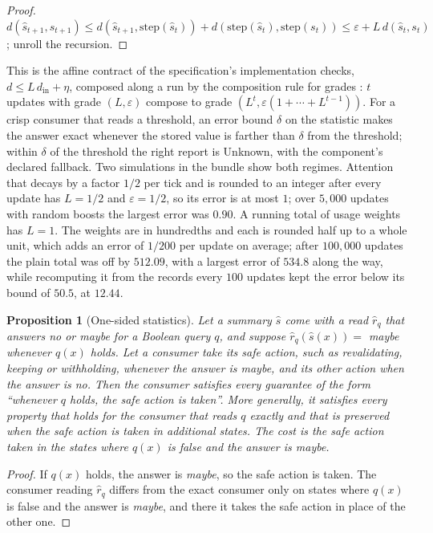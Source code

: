 \documentclass[11pt]{article}
\newcommand{\step}{\mathrm{step}}
\theoremstyle{definition}
\theoremstyle{plain}
\newtheorem{proposition}[definition]{Proposition}
\begin{document}
\begin{proof}
$d(\hat s_{t+1},s_{t+1})\le d(\hat s_{t+1},\step(\hat s_t))+d(\step(\hat s_t),\step(s_t))\le
\varepsilon+L\,d(\hat s_t,s_t)$; unroll the recursion.
\end{proof}

This is the affine contract of the specification's implementation checks, $d\le L\,d_{\mathrm{in}}+
\eta$, composed along a run by the composition rule for grades \cite[Proposition~9.1]{spec}: $t$
updates with grade $(L,\varepsilon)$ compose to grade $(L^t,\varepsilon(1+\cdots+L^{t-1}))$. For a
crisp consumer that reads a threshold, an error bound $\delta$ on the statistic makes the answer
exact whenever the stored value is farther than $\delta$ from the threshold; within $\delta$ of the
threshold the right report is Unknown, with the component's declared fallback.
Two simulations in the bundle show both regimes. Attention that decays by a factor $1/2$ per tick
and is rounded to an integer after every update has $L=1/2$ and $\varepsilon=1/2$, so its error is
at most $1$; over $5{,}000$ updates with random boosts the largest error was $0.90$. A running total
of usage weights has $L=1$. The weights are in hundredths and each is rounded half up to a whole
unit, which adds an error of $1/200$ per update on average; after $100{,}000$ updates the plain
total was off by $512.09$, with a largest error of $534.8$ along the way, while recomputing it from
the records every $100$ updates kept the error below its bound of $50.5$, at $12.44$.

\begin{proposition}[One-sided statistics]\label{prop:onesided}
Let a summary $\hat s$ come with a read $\hat r_q$ that answers \emph{no} or \emph{maybe} for a
Boolean query $q$, and suppose $\hat r_q(\hat s(x))=$ \emph{maybe} whenever $q(x)$ holds. Let a
consumer take its safe action, such as revalidating, keeping or withholding, whenever the answer is
\emph{maybe}, and its other action when the answer is \emph{no}. Then the consumer satisfies every
guarantee of the form ``whenever $q$ holds, the safe action is taken''. More generally, it
satisfies every property that holds for the consumer that reads $q$ exactly and that is preserved
when the safe action is taken in additional states. The cost is the safe action taken in the states
where $q(x)$ is false and the answer is \emph{maybe}.
\end{proposition}

\begin{proof}
If $q(x)$ holds, the answer is \emph{maybe}, so the safe action is taken. The consumer reading
$\hat r_q$ differs from the exact consumer only on states where $q(x)$ is false and the answer is
\emph{maybe}, and there it takes the safe action in place of the other one.
\end{proof}
\end{document}
